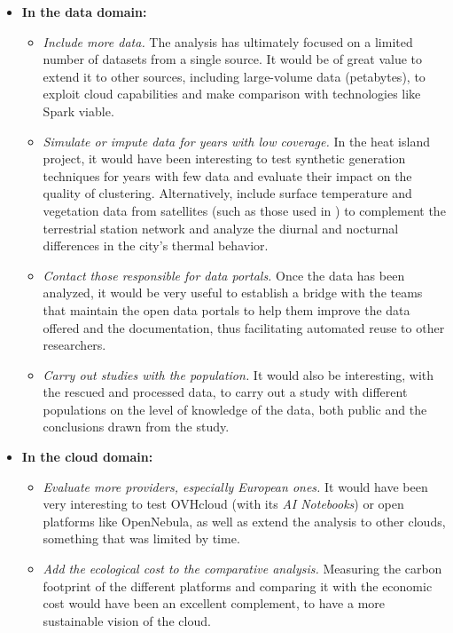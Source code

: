 \begin{itemize}
	\item \textbf{In the data domain:}
	\begin{itemize}
		\item \emph{Include more data.} The analysis has ultimately focused on a limited number of datasets from a single source. It would be of great value to extend it to other sources, including large-volume data (petabytes), to exploit cloud capabilities and make comparison with technologies like Spark viable.
		
		\item \emph{Simulate or impute data for years with low coverage.} In the heat island project, it would have been interesting to test synthetic generation techniques for years with few data and evaluate their impact on the quality of clustering. Alternatively, include surface temperature and vegetation data from satellites (such as those used in \citep{urbanthermal2025}) to complement the terrestrial station network and analyze the diurnal and nocturnal differences in the city's thermal behavior.
		
		\item \emph{Contact those responsible for data portals.} Once the data has been analyzed, it would be very useful to establish a bridge with the teams that maintain the open data portals to help them improve the data offered and the documentation, thus facilitating automated reuse to other researchers.
		
		\item \emph{Carry out studies with the population.} It would also be interesting, with the rescued and processed data, to carry out a study with different populations on the level of knowledge of the data, both public and the conclusions drawn from the study.
	\end{itemize}
	
	\item \textbf{In the cloud domain:}
	\begin{itemize}
		\item \emph{Evaluate more providers, especially European ones.} It would have been very interesting to test OVHcloud (with its \textit{AI Notebooks}) or open platforms like OpenNebula, as well as extend the analysis to other clouds, something that was limited by time.
		
		\item \emph{Add the ecological cost to the comparative analysis.} Measuring the carbon footprint of the different platforms and comparing it with the economic cost would have been an excellent complement, to have a more sustainable vision of the cloud.
		

\end{itemize}
\end{itemize}
